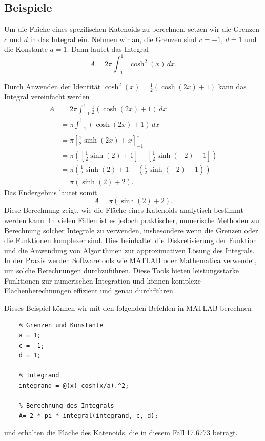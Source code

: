 \subsection{Beispiele
	\label{Das Katenoid:subsection:Beispiele}}
Um die Fläche eines spezifischen Katenoids zu berechnen, setzen wir die Grenzen $c$ und $d$ in das Integral ein.
Nehmen wir an, die Grenzen sind $c =-1$, $d=1$ und die Konstante $a=1$.
Dann lautet das Integral	
\[
A = 2\pi \int_{-1}^{1} \cosh^2 (x) \, dx.
\]

Durch Anwenden der Identität \(\cosh^2 (x) = \frac{1}{2} (\cosh (2x) + 1)\) kann das Integral vereinfacht werden
\begin{align*}
	A &= 2\pi \int_{-1}^{1} \frac{1}{2} (\cosh (2x) + 1) \, dx \\
	&= \pi \int_{-1}^{1} (\cosh (2x) + 1) \,dx \\
	&= \pi \left[ \frac{1}{2} \sinh (2x) + x \right]_{-1}^{1} \\
	&= \pi \left( \left[ \frac{1}{2} \sinh (2) + 1 \right] - \left[ \frac{1}{2} \sinh (-2) - 1 \right] \right) \\
	&= \pi \left( \frac{1}{2} \sinh (2) + 1 - \left( \frac{1}{2} \sinh (-2) - 1 \right) \right) \\
	&= \pi \left( \sinh (2) + 2 \right).
\end{align*}
%
Das Endergebnis lautet somit
\[
A = \pi (\sinh (2) + 2).
\]
Diese Berechnung zeigt, wie die Fläche eines Katenoids analytisch bestimmt werden kann.
In vielen Fällen ist es jedoch praktischer, numerische Methoden zur Berechnung solcher Integrale zu verwenden, insbesondere wenn die Grenzen oder die Funktionen komplexer sind.
Dies beinhaltet die Diskretisierung der Funktion und die Anwendung von Algorithmen zur approximativen Lösung des Integrals.
In der Praxis werden Softwaretools wie MATLAB oder Mathematica verwendet, um solche Berechnungen durchzuführen.
Diese Tools bieten leistungsstarke Funktionen zur numerischen Integration und können komplexe Flächenberechnungen effizient und genau durchführen.

Dieses Beispiel können wir mit den folgenden Befehlen in MATLAB berechnen

\begin{lstlisting}
	% Grenzen und Konstante
	a = 1;
	c = -1;
	d = 1;
	
	% Integrand
	integrand = @(x) cosh(x/a).^2;
	
	% Berechnung des Integrals
	A= 2 * pi * integral(integrand, c, d);
\end{lstlisting}
%
und erhalten die Fläche des Katenoids, die in diesem Fall 17.6773 beträgt.


